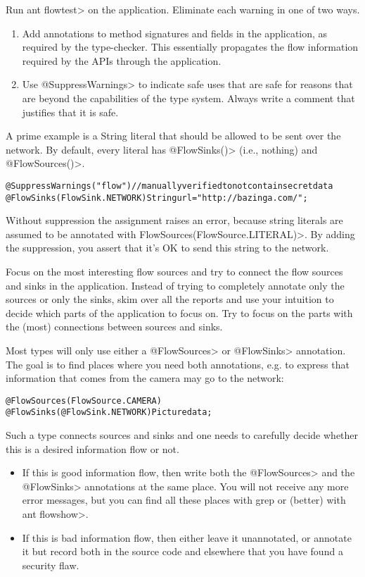 Run \<ant flowtest> on the application.
Eliminate each warning in one of two ways.
\begin{enumerate}
\item Add annotations to method signatures and fields in the application, as
required by the type-checker. This essentially propagates the flow
information required by the APIs through the application.

\item Use \<@SuppressWarnings> to indicate safe uses that are safe for reasons
that are beyond the capabilities of the type system. Always write a
comment that justifies that it is safe.
\end{enumerate}
A prime example is a String literal that should be allowed to be sent
over the network. By default, every literal has \<@FlowSinks()>
(i.e., nothing) and \<@FlowSources()>.

\begin{alltt}
    @SuppressWarnings("flow") // manually verified to not contain secret data
    @FlowSinks(FlowSink.NETWORK) String url = "http://bazinga.com/";
\end{alltt}

\noindent
Without suppression the assignment raises an error, because string literals
are assumed to be annotated with \<FlowSources(FlowSource.LITERAL)>. By adding the suppression, you
assert that it's OK to send this string to the network. 

Focus on the most interesting flow sources and try to connect the flow
sources and sinks in the application. Instead of trying to completely
annotate only the sources or only the sinks, skim over all the reports
and use your intuition to decide which parts of the application to
focus on. Try to focus on the parts with the (most) connections
between sources and sinks.

Most types will only use either a \<@FlowSources> or \<@FlowSinks>
annotation.
The goal is to find places where you need both annotations, e.g. to
express that information that comes from the camera may go to the
network:

\begin{alltt}
    @FlowSources(FlowSource.CAMERA)
    @FlowSinks(@FlowSink.NETWORK) Picture data;
\end{alltt}

Such a type connects sources and sinks and one needs to carefully
decide whether this is a desired information flow or not.
\begin{itemize}
\item If this is good information flow, then write both the \<@FlowSources>
  and the \<@FlowSinks> annotations at the same place. You will not
  receive any more error messages, but you can find all these places
  with grep or (better) with \<ant flowshow>.
\item If this is bad information flow, then either leave it unannotated,
  or annotate it but record both in the source code and elsewhere that
  you have found a security flaw.
\end{itemize}

